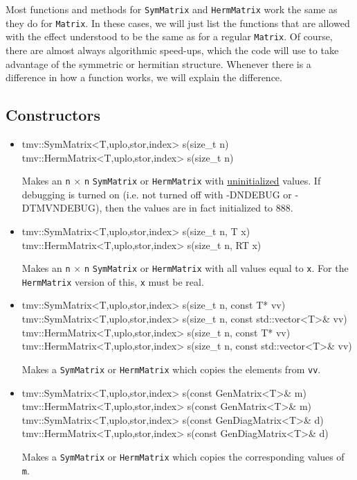 \documentclass[twoside,letterpaper,11pt]{article}
\renewcommand{\tt}[1]{{\lstinline {#1}}}
\begin{document}
Most functions and methods for \tt{SymMatrix} and \tt{HermMatrix}
work the same as they do for \tt{Matrix}.
In these cases, we will just list the functions that are allowed with the
effect understood to be the same as for a regular \tt{Matrix}.  Of course, there are 
almost always algorithmic speed-ups, which the code will use to take advantage of the 
symmetric or hermitian structure.
Whenever there is a difference in how a function works,
we will explain the difference.


\subsection{Constructors}
\label{SymMatrix_Constructors}

\begin{itemize}
\item 
\begin{tmvcode}
tmv::SymMatrix<T,uplo,stor,index> s(size_t n)
tmv::HermMatrix<T,uplo,stor,index> s(size_t n)
\end{tmvcode}
Makes an \tt{n} $\times$ \tt{n} \tt{SymMatrix} or \tt{HermMatrix}
with \underline{uninitialized} values.
If debugging is turned on (i.e. not turned off
with -DNDEBUG or -DTMVNDEBUG), then the values are in fact initialized to 888.  

\item
\begin{tmvcode}
tmv::SymMatrix<T,uplo,stor,index> s(size_t n, T x)
tmv::HermMatrix<T,uplo,stor,index> s(size_t n, RT x)
\end{tmvcode}
Makes an \tt{n} $\times$ \tt{n} \tt{SymMatrix} or \tt{HermMatrix} 
with all values equal to \tt{x}.
For the \tt{HermMatrix} version of this, \tt{x} must be real.

\item
\begin{tmvcode}
tmv::SymMatrix<T,uplo,stor,index> s(size_t n, const T* vv)
tmv::SymMatrix<T,uplo,stor,index> s(size_t n, 
      const std::vector<T>& vv)
tmv::HermMatrix<T,uplo,stor,index> s(size_t n, const T* vv)
tmv::HermMatrix<T,uplo,stor,index> s(size_t n, 
      const std::vector<T>& vv)
\end{tmvcode}
Makes a \tt{SymMatrix} or \tt{HermMatrix} which copies the elements from \tt{vv}.

\item 
\begin{tmvcode}
tmv::SymMatrix<T,uplo,stor,index> s(const GenMatrix<T>& m)
tmv::HermMatrix<T,uplo,stor,index> s(const GenMatrix<T>& m)
tmv::SymMatrix<T,uplo,stor,index> s(const GenDiagMatrix<T>& d)
tmv::HermMatrix<T,uplo,stor,index> s(const GenDiagMatrix<T>& d)
\end{tmvcode}
Makes a \tt{SymMatrix} or \tt{HermMatrix} which copies the corresponding values of \tt{m}.


\end{itemize}
\end{document}
